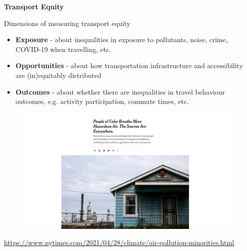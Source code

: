 \documentclass[aspectratio=169]{beamer}
\begin{document}
\begin{frame}
	
	\textbf{Transport Equity}
	
	\vspace{4mm}
	
	Dimensions of measuring transport equity
	
	\begin{itemize}	
		
		\item \textbf{Exposure} - about inequalities in exposure to pollutants, noise, crime, COVID-19 when travelling, etc.
		
		\item \textbf{Opportunities} - about how transportation infrastructure and accessibility are (in)equitably distributed
		
		\item \textbf{Outcomes} - about whether there are inequalities in travel behaviour outcomes, e.g. activity participation, commute times, etc.
		
	\end{itemize}
	
	
\end{frame}



\begin{frame}
	
	\begin{figure}
		\centering
		\includegraphics[width=1\linewidth]{images/race-pollution}
	\end{figure}

	\tiny\url{https://www.nytimes.com/2021/04/28/climate/air-pollution-minorities.html}
	
\end{frame}
\end{document}

